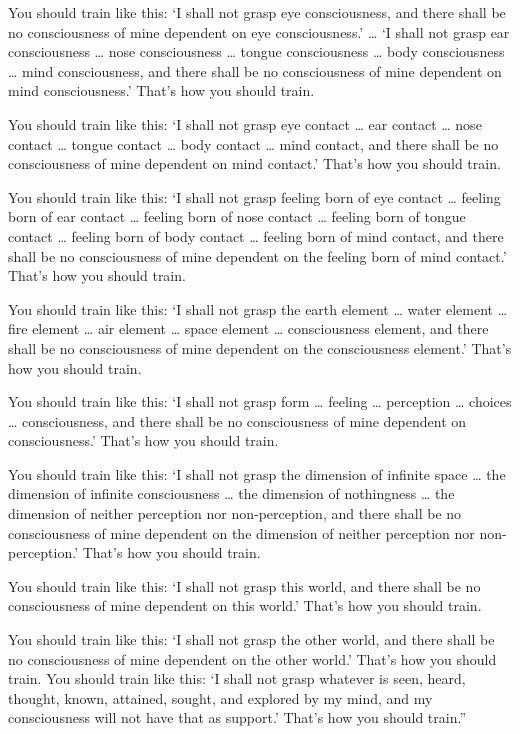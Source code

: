 \documentclass[12pt,openany]{book}%
\begin{document}
You should train like this: ‘I shall not grasp eye consciousness, and there shall be no consciousness of mine dependent on eye consciousness.’ … ‘I shall not grasp ear consciousness … nose consciousness … tongue consciousness … body consciousness … mind consciousness, and there shall be no consciousness of mine dependent on mind consciousness.’ That’s how you should train. 

You should train like this: ‘I shall not grasp eye contact … ear contact … nose contact … tongue contact … body contact … mind contact, and there shall be no consciousness of mine dependent on mind contact.’ That’s how you should train. 

You should train like this: ‘I shall not grasp feeling born of eye contact … feeling born of ear contact … feeling born of nose contact … feeling born of tongue contact … feeling born of body contact … feeling born of mind contact, and there shall be no consciousness of mine dependent on the feeling born of mind contact.’ That’s how you should train. 

You should train like this: ‘I shall not grasp the earth element … water element … fire element … air element … space element … consciousness element, and there shall be no consciousness of mine dependent on the consciousness element.’ That’s how you should train. 

You should train like this: ‘I shall not grasp form … feeling … perception … choices … consciousness, and there shall be no consciousness of mine dependent on consciousness.’ That’s how you should train. 

You should train like this: ‘I shall not grasp the dimension of infinite space … the dimension of infinite consciousness … the dimension of nothingness … the dimension of neither perception nor non-perception, and there shall be no consciousness of mine dependent on the dimension of neither perception nor non-perception.’ That’s how you should train. 

You should train like this: ‘I shall not grasp this world, and there shall be no consciousness of mine dependent on this world.’ That’s how you should train. 

You should train like this: ‘I shall not grasp the other world, and there shall be no consciousness of mine dependent on the other world.’ That’s how you should train. You should train like this: ‘I shall not grasp whatever is seen, heard, thought, known, attained, sought, and explored by my mind, and my consciousness will not have that as support.’ That’s how you should train.” 
\end{document}
